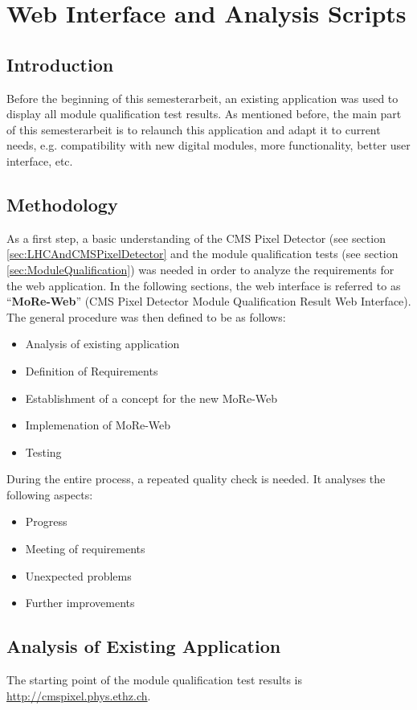\documentclass[0_Bericht]{subfiles}
\begin{document}
	\section{Web Interface and Analysis Scripts}
		\subsection{Introduction}	
			Before the beginning of this semesterarbeit, an existing application was used to display all module qualification test results. As mentioned before, the main part of this semesterarbeit is to relaunch this application and adapt it to current needs, e.g. compatibility with new digital modules, more functionality, better user interface, etc.
		\subsection{Methodology}
			As a first step, a basic understanding of the CMS Pixel Detector (see section \ref{sec:LHCAndCMSPixelDetector} and the module qualification tests (see section \ref{sec:ModuleQualification}) was needed in order to analyze the requirements for the web application. In the following sections, the web interface is referred to as ``\textbf{MoRe-Web}'' (CMS Pixel Detector Module Qualification Result Web Interface).
			The general procedure was then defined to be as follows:
			\begin{itemize}
				\item Analysis of existing application
				\item Definition of Requirements
				\item Establishment of a concept for the new MoRe-Web
				\item Implemenation of MoRe-Web
				\item Testing
			\end{itemize}
			During the entire process, a repeated quality check is needed. It analyses the following aspects:
			\begin{itemize}
				\item Progress
				\item Meeting of requirements
				\item Unexpected problems
				\item Further improvements
			\end{itemize}
			
		\subsection{Analysis of Existing Application}
			The starting point of the module qualification test results is \url{http://cmspixel.phys.ethz.ch}.
\end{document}
